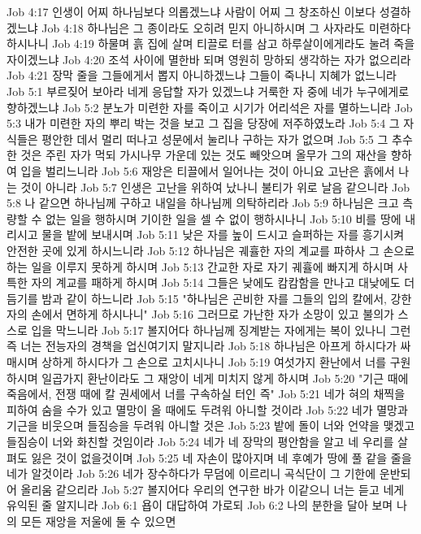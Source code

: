 Job 4:17  인생이 어찌 하나님보다 의롭겠느냐 사람이 어찌 그 창조하신 이보다 성결하겠느냐
Job 4:18  하나님은 그 종이라도 오히려 믿지 아니하시며 그 사자라도 미련하다 하시나니
Job 4:19  하물며 흙 집에 살며 티끌로 터를 삼고 하루살이에게라도 눌려 죽을 자이겠느냐
Job 4:20  조석 사이에 멸한바 되며 영원히 망하되 생각하는 자가 없으리라
Job 4:21  장막 줄을 그들에게서 뽑지 아니하겠느냐 그들이 죽나니 지혜가 없느니라
Job 5:1  부르짖어 보아라 네게 응답할 자가 있겠느냐 거룩한 자 중에 네가 누구에게로 향하겠느냐
Job 5:2  분노가 미련한 자를 죽이고 시기가 어리석은 자를 멸하느니라
Job 5:3  내가 미련한 자의 뿌리 박는 것을 보고 그 집을 당장에 저주하였노라
Job 5:4  그 자식들은 평안한 데서 멀리 떠나고 성문에서 눌리나 구하는 자가 없으며
Job 5:5  그 추수한 것은 주린 자가 먹되 가시나무 가운데 있는 것도 빼앗으며 올무가 그의 재산을 향하여 입을 벌리느니라
Job 5:6  재앙은 티끌에서 일어나는 것이 아니요 고난은 흙에서 나는 것이 아니라
Job 5:7  인생은 고난을 위하여 났나니 불티가 위로 날음 같으니라
Job 5:8  나 같으면 하나님께 구하고 내일을 하나님께 의탁하리라
Job 5:9  하나님은 크고 측량할 수 없는 일을 행하시며 기이한 일을 셀 수 없이 행하시나니
Job 5:10  비를 땅에 내리시고 물을 밭에 보내시며
Job 5:11  낮은 자를 높이 드시고 슬퍼하는 자를 흥기시켜 안전한 곳에 있게 하시느니라
Job 5:12  하나님은 궤휼한 자의 계교를 파하사 그 손으로 하는 일을 이루지 못하게 하시며
Job 5:13  간교한 자로 자기 궤휼에 빠지게 하시며 사특한 자의 계교를 패하게 하시며
Job 5:14  그들은 낮에도 캄캄함을 만나고 대낮에도 더듬기를 밤과 같이 하느니라
Job 5:15  "하나님은 곤비한 자를 그들의 입의 칼에서, 강한 자의 손에서 면하게 하시나니"
Job 5:16  그러므로 가난한 자가 소망이 있고 불의가 스스로 입을 막느니라
Job 5:17  볼지어다 하나님께 징계받는 자에게는 복이 있나니 그런즉 너는 전능자의 경책을 업신여기지 말지니라
Job 5:18  하나님은 아프게 하시다가 싸매시며 상하게 하시다가 그 손으로 고치시나니
Job 5:19  여섯가지 환난에서 너를 구원하시며 일곱가지 환난이라도 그 재앙이 네게 미치지 않게 하시며
Job 5:20  "기근 때에 죽음에서, 전쟁 때에 칼 권세에서 너를 구속하실 터인 즉"
Job 5:21  네가 혀의 채찍을 피하여 숨을 수가 있고 멸망이 올 때에도 두려워 아니할 것이라
Job 5:22  네가 멸망과 기근을 비웃으며 들짐승을 두려워 아니할 것은
Job 5:23  밭에 돌이 너와 언약을 맺겠고 들짐승이 너와 화친할 것임이라
Job 5:24  네가 네 장막의 평안함을 알고 네 우리를 살펴도 잃은 것이 없을것이며
Job 5:25  네 자손이 많아지며 네 후예가 땅에 풀 같을 줄을 네가 알것이라
Job 5:26  네가 장수하다가 무덤에 이르리니 곡식단이 그 기한에 운반되어 올리움 같으리라
Job 5:27  볼지어다 우리의 연구한 바가 이같으니 너는 듣고 네게 유익된 줄 알지니라
Job 6:1  욥이 대답하여 가로되
Job 6:2  나의 분한을 달아 보며 나의 모든 재앙을 저울에 둘 수 있으면
